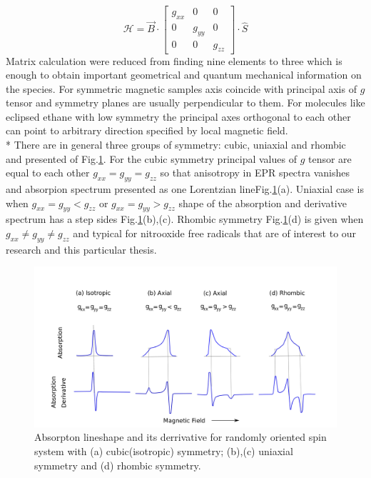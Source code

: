 \begin{equation}\label{eq:princham}
\mathcal{H}=\vec{B}\cdot \begin{bmatrix} g_{xx} & 0 & 0 \\ 0 & g_{yy} & 0\\ 0 & 0 & g_{zz}\end{bmatrix}\cdot \hat{S}
\end{equation}   
Matrix calculation were reduced from finding nine elements to three which is enough to obtain important geometrical and quantum mechanical information on the species. For symmetric magnetic samples axis coincide with principal axis of $g$ tensor and symmetry planes are usually perpendicular to them. For molecules like eclipsed ethane with low symmetry the principal axes orthogonal to each other can point to arbitrary direction specified by local magnetic field.\\*
There are in general three groups of symmetry: cubic, uniaxial and rhombic and presented of Fig.\ref{figure:gsym}. For the cubic symmetry principal values of $g$ tensor are equal to each other $g_{xx}=g_{yy}=g_{zz}$ so that anisotropy in EPR spectra vanishes and absorpion spectrum presented as one Lorentzian lineFig.\ref{figure:gsym}(a). Uniaxial case is when $g_{xx}=g_{yy}<g_{zz}$ or $g_{xx}=g_{yy}>g_{zz}$ shape of the absorption and derivative spectrum has a step sides Fig.\ref{figure:gsym}(b),(c). Rhombic symmetry Fig.\ref{figure:gsym}(d) is given when $g_{xx}\neq g_{yy}\neq g_{zz}$ and typical for nitrooxide free radicals that are of interest to our research and this particular thesis. 
\begin{figure}[h!]
\begin{center}
\includegraphics[width=1\textwidth]{figures/chap1/gten1.png}
\caption{Absorpton lineshape and its derrivative for randomly oriented spin system with (a) cubic(isotropic) symmetry; (b),(c) uniaxial symmetry and (d) rhombic symmetry.}
\label{figure:gsym}
\end{center}
\end{figure}

